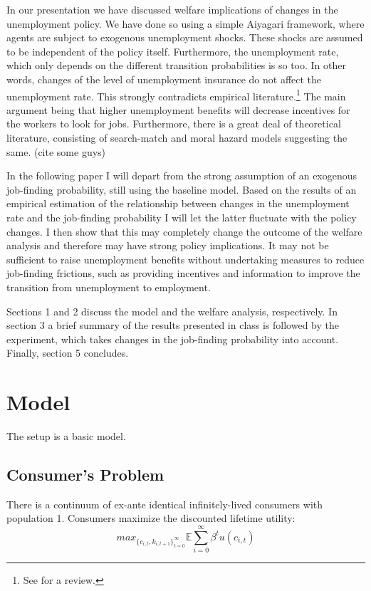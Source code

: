 \documentclass[a4paper,12pt]{article}
\begin{document}
In our presentation we have discussed welfare implications of changes in the unemployment policy. We have done so using a simple Aiyagari framework, where agents are subject to exogenous unemployment shocks. These shocks are assumed to be independent of the policy itself. Furthermore, the unemployment rate, which only depends on the different transition probabilities is so too. In other words, changes of the level of unemployment insurance do not affect the unemployment rate. This strongly contradicts empirical literature.\footnote{See \citep{decker} for a review.} The main argument being that higher unemployment benefits will decrease incentives for the workers to look for jobs. Furthermore, there is a great deal of theoretical literature, consisting of search-match and moral hazard models suggesting the same. (cite some guys) 

In the following paper I will depart from the strong assumption of an exogenous job-finding probability, still using the baseline model. Based on the results of an empirical estimation of the relationship between changes in the unemployment rate and the job-finding probability I will let the latter fluctuate with the policy changes. I then show that this may completely change the outcome of the welfare analysis and therefore may have strong policy implications. It may not be sufficient to raise unemployment benefits without undertaking measures to reduce job-finding frictions, such as providing incentives and information to improve the transition from unemployment to employment.

Sections 1 and 2 discuss the model and the welfare analysis, respectively. In section 3 a brief summary of the results presented in class is followed by the experiment, which takes changes in the job-finding probability into account. Finally, section 5 concludes. 


\section{Model}

The setup is a basic \cite{aiyagari} model. 

\subsection{Consumer's Problem}

There is a continuum of ex-ante identical infinitely-lived consumers with population 1. Consumers maximize the discounted lifetime utility: 
\[ 
 max_{\{{ c_{i,t}, k_{i,t+1} }\}_{t = 0}^{\infty}} {\mathbb{E}} \sum_{i=0}^{\infty} \beta^{t}  u(c_{i,t}) 
 \]
\end{document}
